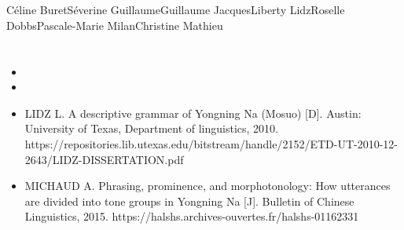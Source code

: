 	\section{ } \label{sec:thks}
	
Céline BuretSéverine GuillaumeGuillaume JacquesLiberty LidzRoselle DobbsPascale-Marie MilanChristine Mathieu




	\section{ } \label{sec:refs}
	\begin{itemize}
		\item {}
		\item {}
		\item LIDZ L. A descriptive grammar of Yongning Na (Mosuo) [D]. Austin: University of Texas, Department of linguistics, 2010.
		https://repositories.lib.utexas.edu/bitstream/handle/2152/ETD-UT-2010-12-2643/LIDZ-DISSERTATION.pdf
		\item MICHAUD A. Phrasing, prominence, and morphotonology: How utterances are divided into tone groups in Yongning Na [J]. Bulletin of Chinese Linguistics, 2015. https://halshs.archives-ouvertes.fr/halshs-01162331
	\end{itemize}

\cleardoublepage
{}
\setcounter{page}{1}
 

	

